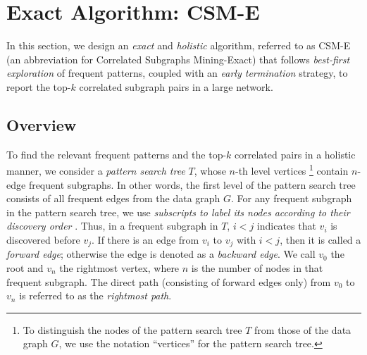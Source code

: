 \section{Exact Algorithm: {\sf CSM-E}}
\label{sec:exact_algo}
\begin{comment}
A Na\"{\i}ve approach to find the top-$k$ correlated pairs would be to {\bf (1)} first identify
all frequent subgraph patterns based on the minimum support threshold $\Sigma$ (e.g.,
via GRAMI \cite{EASK14}); {\bf (2)} enumerate all their instances in the data graph (e.g.,
via VF3 \cite{CarlettiFSV18}); {\bf (3)} compute correlation for every pair of frequent subgraph patterns;
and finally {\bf (4)} report the top-$k$ correlated pairs among them. However, this baseline method
is inefficient: Since we are interested in finding {\em only} the top-$k$ correlated pairs, computing
correlations for all pairs of frequent subgraph patterns would be expensive and also redundant.
\end{comment}
In this section, we design an {\em exact} and {\em holistic} algorithm, referred to
as {\sf CSM-E} (an abbreviation for Correlated Subgraphs Mining-Exact)
that follows {\em best-first exploration} of
frequent patterns, coupled with an {\em early termination} strategy, to report the top-$k$ correlated
subgraph pairs in a large network.
%
\subsection{Overview}
\label{sec:exact_algo_overview}
%
To find the relevant frequent patterns and the top-$k$ correlated pairs in a
holistic manner, we consider a {\em pattern search tree} $T$, whose $n$-th level
vertices \footnote{{\footnotesize To distinguish the nodes of the pattern search
tree $T$ from those of the data graph $G$, we use the notation ``vertices'' for
the pattern search tree.}} contain $n$-edge frequent subgraphs. In other words,
the first level of the pattern search tree consists of all frequent edges from
the data graph $G$. For any frequent subgraph in the pattern search tree, we use
{\em subscripts to label its nodes according to their discovery order}
\cite{YH02}. Thus, in a frequent subgraph in $T$, $i<j$ indicates that $v_i$ is
discovered before $v_j$. If there is an edge from $v_i$ to $v_j$ with $i<j$,
then it is called a {\em forward edge}; otherwise the edge is denoted as a {\em
backward edge}. We call $v_0$ the root and $v_n$ the rightmost vertex, where $n$
is the number of nodes in that frequent subgraph. The direct path (consisting
of forward edges only) from $v_0$ to $v_n$ is referred to as the {\em rightmost
path}.

